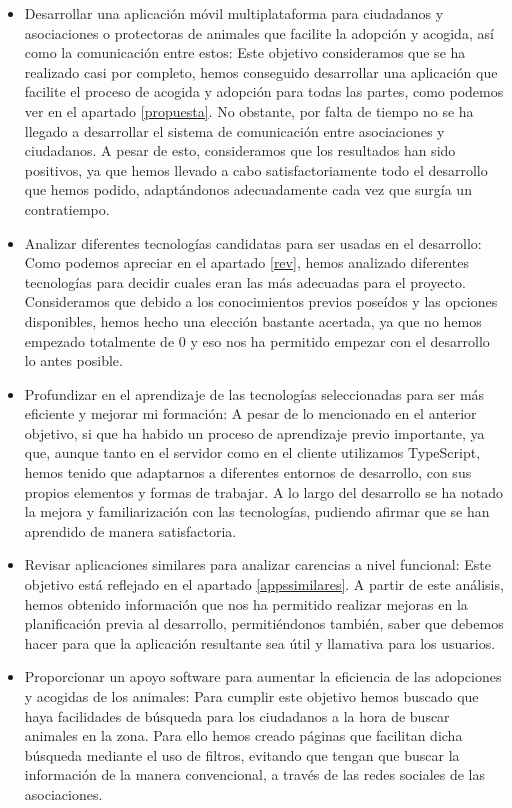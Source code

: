 \begin{itemize}
	\item Desarrollar una aplicación móvil multiplataforma para ciudadanos y asociaciones o protectoras de animales que facilite la adopción y acogida, así como la comunicación entre estos: Este objetivo consideramos que se ha realizado casi por completo, hemos conseguido desarrollar una aplicación que facilite el proceso de acogida y adopción para todas las partes, como podemos ver en el apartado \ref{propuesta}. No obstante, por falta de tiempo no se ha llegado a desarrollar el sistema de comunicación entre asociaciones y ciudadanos. A pesar de esto, consideramos que los resultados han sido positivos, ya que hemos llevado a cabo satisfactoriamente todo el desarrollo que hemos podido, adaptándonos adecuadamente cada vez que surgía un contratiempo.
	
	\item Analizar diferentes tecnologías candidatas para ser usadas en el desarrollo: Como podemos apreciar en el apartado \ref{rev}, hemos analizado diferentes tecnologías para decidir cuales eran las más adecuadas para el proyecto. Consideramos que debido a los conocimientos previos poseídos y las opciones disponibles, hemos hecho una elección bastante acertada, ya que no hemos empezado totalmente de 0 y eso nos ha permitido empezar con el desarrollo lo antes posible.
	
	\item Profundizar en el aprendizaje de las tecnologías seleccionadas para ser más eficiente y mejorar mi formación: A pesar de lo mencionado en el anterior objetivo, si que ha habido un proceso de aprendizaje previo importante, ya que, aunque tanto en el servidor como en el cliente utilizamos TypeScript, hemos tenido que adaptarnos a diferentes entornos de desarrollo, con sus propios elementos y formas de trabajar. A lo largo del desarrollo se ha notado la mejora y familiarización con las tecnologías, pudiendo afirmar que se han aprendido de manera satisfactoria.
	
	\item Revisar aplicaciones similares para analizar carencias a nivel funcional: Este objetivo está reflejado en el apartado \ref{appssimilares}. A partir de este análisis, hemos obtenido información que nos ha permitido realizar mejoras en la planificación previa al desarrollo, permitiéndonos también, saber que debemos hacer para que la aplicación resultante sea útil y llamativa para los usuarios.
	
	\item Proporcionar un apoyo software para aumentar la eficiencia de las adopciones y acogidas de los animales: Para cumplir este objetivo hemos buscado que haya facilidades de búsqueda para los ciudadanos a la hora de buscar animales en la zona. Para ello hemos creado páginas que facilitan dicha búsqueda mediante el uso de filtros, evitando que tengan que buscar la información de la manera convencional, a través de las redes sociales de las asociaciones.
	

\end{itemize}
